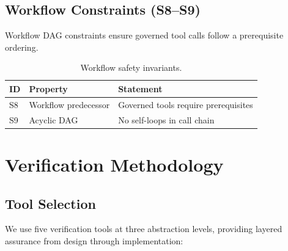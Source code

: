 \documentclass[sigplan,screen,nonacm]{acmart}
\begin{document}
\subsection{Workflow Constraints (S8--S9)}
\label{sec:workflow}

Workflow DAG constraints ensure governed tool calls follow a prerequisite
ordering.

\begin{table}[h]
\caption{Workflow safety invariants.}
\label{tab:workflow-safety}
\small
\begin{tabular}{@{}llp{5.2cm}@{}}
\toprule
ID & Property & Statement \\
\midrule
S8 & Workflow predecessor & Governed tools require prerequisites \\
S9 & Acyclic DAG & No self-loops in call chain \\
\bottomrule
\end{tabular}
\end{table}


\section{Verification Methodology}
\label{sec:methodology}

\subsection{Tool Selection}

We use five verification tools at three abstraction levels, providing
layered assurance from design through implementation:
\end{document}

